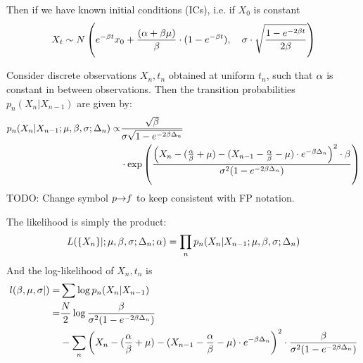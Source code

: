 \documentclass{article}
\begin{document}
Then if we have known initial conditions (ICs), i.e. if $X_0$ is constant 
$$
X_t \sim N \left(e^{-{\beta} t} x_0 + \frac{({\alpha} + {\beta} {\mu })}{{\beta}} \cdot ( 1- e^{-{\beta} t}),
\quad  {\sigma }  \cdot \sqrt{ \frac{ 1 - e^{-2{\beta} t}}{2{\beta}}} \right)
$$

Consider discrete observations ${X_n, t_n}$ obtained at uniform
$t_n$, such that ${\alpha}$ is constant in between observations.
Then the transition probabilities $p_n(X_n|X_{n-1})$ are given by:
\begin{align*}
p_n(X_n|X_{n-1}; {\mu },{\beta}, {\sigma }; \Delta_n) \propto &
\frac{\sqrt {{\beta}}}{{\sigma } \sqrt{1 -  e^{-2{\beta} \Delta_n}}}
\\ &\cdot 
\exp\left(\frac{\left( X_n - (\frac {{\alpha}}{{\beta}} + \mu)  - (X_{n-1} - \frac {{\alpha}}{{\beta}} - \mu) \cdot
e^{-{\beta} \Delta_n} \right)^2 \cdot {\beta}}
			{ {\sigma }^2  (1-e^{-2{\beta}\Delta_n})} \right)
\end{align*}
TODO: Change symbol $p {\rightarrow} f$ to keep consistent with FP notation.

The likelihood is simply the product:
\begin{equation}
L( \{X_n\}| ; {\mu },{\beta}, {\sigma }; \Delta_n; {\alpha}) = \prod_n p_n(X_n|X_{n-1}; {\mu },{\beta}, {\sigma };
\Delta_n)
\label{eq:Likelihood_OU}
\end{equation}
And the log-likelihood of  ${X_n, t_n}$ is
\begin{align*}
l({\beta}, {\mu }, {\sigma } | )=& \sum \log p_n(X_n|X_{n-1})
\\
=& \frac{N}{2} \log \frac{{\beta}}{{\sigma }^2(1-e^{-2{\beta}\Delta_n})}
\\ & -\sum_n
{\left( X_n - (\frac {{\alpha}}{{\beta}} + \mu)  - 
		(X_{n-1} - \frac {{\alpha}}{{\beta}} - \mu) \cdot e^{-{\beta} \Delta_n} \right)^2 } \cdot
				\frac{{\beta}}{{\sigma }^2  (1-e^{-2{\beta}\Delta_n})}
\end{align*}

\def \Xn {{ X_n }}
\def \Xm {{ X_{n-1} }}
\def \deltan {{ \Delta_n }}
\end{document}
